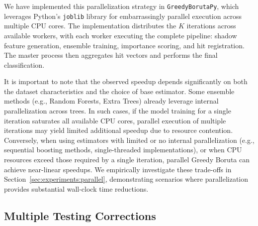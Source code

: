 \documentclass[runningheads]{llncs}
\newcommand{\writeme}[1]{\todo[inline,color=yellow!40]{WRITE: #1}}
\begin{document}
We have implemented this parallelization strategy in \texttt{GreedyBorutaPy}, which leverages Python's \texttt{joblib} library for embarrassingly parallel execution across multiple CPU cores. The implementation distributes the $K$ iterations across available workers, with each worker executing the complete pipeline: shadow feature generation, ensemble training, importance scoring, and hit registration. The master process then aggregates hit vectors and performs the final classification.

It is important to note that the observed speedup depends significantly on both the dataset characteristics and the choice of base estimator. Some ensemble methods (e.g., Random Forests, Extra Trees) already leverage internal parallelization across trees. In such cases, if the model training for a single iteration saturates all available CPU cores, parallel execution of multiple iterations may yield limited additional speedup due to resource contention. Conversely, when using estimators with limited or no internal parallelization (e.g., sequential boosting methods, single-threaded implementations), or when CPU resources exceed those required by a single iteration, parallel Greedy Boruta can achieve near-linear speedups. We empirically investigate these trade-offs in Section~\ref{sec:experiments:parallel}, demonstrating scenarios where parallelization provides substantial wall-clock time reductions.


\subsection{Multiple Testing Corrections}
\label{sec:method:corrections}
\end{document}
